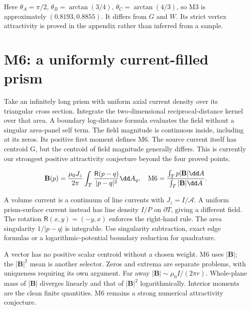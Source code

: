 \documentclass[11pt,oneside,openany]{book}
\begin{document}
Here $\theta_A=\pi/2$, $\theta_B=\arctan(3/4)$,
$\theta_C=\arctan(4/3)$, so M3 is approximately $(0.8193,0.8855)$.
It differs from $G$ and $W$. Its strict vertex attractivity is proved
in the appendix rather than inferred from a sample.




\section{M6: a uniformly current-filled prism}\label{sec:slide27}

Take an infinitely long prism with uniform axial current density over its triangular cross section. Integrate the two-dimensional reciprocal-distance kernel over that area. A boundary log-distance formula evaluates the field without a singular area-panel self term. The field magnitude is continuous inside, including at its zeros. Its positive first moment defines M6. The source current itself has centroid G, but the centroid of field magnitude generally differs. This is currently our strongest positive attractivity conjecture beyond the four proved points.


\[\mathbf B(p)=\frac{\mu_0J_z}{2\pi}\int_T\frac{\mathsf R(p-q)}{|p-q|^2}\dd A_q,\quad {\rm M6}=\frac{\int_Tp|\mathbf B|\dd A}{\int_T|\mathbf B|\dd A}.\]



A volume current is a continuum of line currents with
$J_z=I/\mathcal A$. A uniform prism-surface current instead has
line density $I/P$ on $\partial T$, giving a different field.
The rotation $\mathsf R(x,y)=(-y,x)$ enforces the right-hand rule.
The area singularity $1/|p-q|$ is integrable. Use singularity
subtraction, exact edge formulas or a logarithmic-potential boundary
reduction for quadrature.

A vector has no positive scalar centroid without a chosen weight.
M6 uses $|\mathbf B|$; the $|\mathbf B|^2$ mean is another selector.
Zeros and extrema are separate problems, with uniqueness requiring
its own argument.
Far away $|\mathbf B|\sim\mu_0I/(2\pi r)$.
Whole-plane mass of $|\mathbf B|$ diverges linearly and that of
$|\mathbf B|^2$ logarithmically. Interior moments are the clean
finite quantities. M6 remains a strong numerical attractivity
conjecture.
\end{document}
